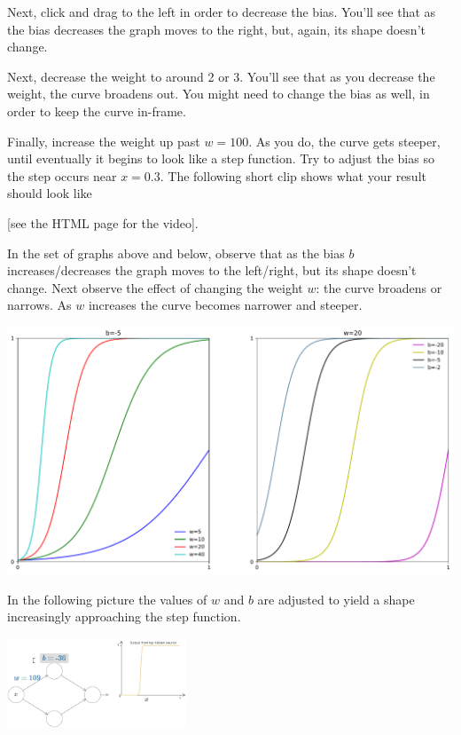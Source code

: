 Next, click and drag to the left in order to decrease the bias. You'll see that as the bias decreases the graph moves to the right, but, again, its shape doesn't change.

Next, decrease the weight to around 2 or 3. You'll see that as you decrease the weight, the curve broadens out. You might need to change the bias as well, in order to keep the curve in-frame.

Finally, increase the weight up past $w=100$. As you do, the curve gets steeper, until eventually it begins to look like a step function. Try to adjust the bias so the step occurs near $x=0.3$. The following short clip shows what your result should look like 

[see the HTML page for the video].



In the set of graphs above and below, observe  that as the bias $b$ increases/decreases the graph moves to the left/right, but its shape doesn't change.
Next observe the effect of changing the weight $w$: the curve broadens or narrows. As $w$ increases the curve becomes narrower and steeper.

{\centering \includegraphics[width=\textwidth,]{eps/sigmoid1x2plot} \par}

In the following picture the values of $w$ and $b$ are adjusted to yield a shape increasingly approaching the step function.
{\centering \includegraphics[width=0.4\textwidth,]{pic/wigglyfn08.png} \par}


